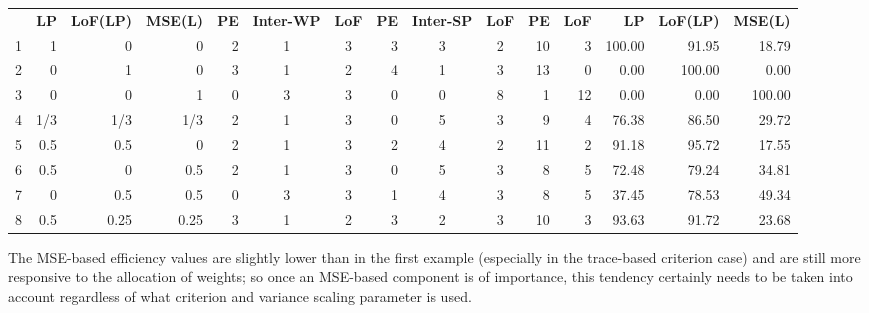 \begin{table}[h]
{\begin{tabular}{rrrrccccccrrrrr}
  & \textbf{LP} & \textbf{LoF(LP)} & \textbf{MSE(L)} & \textbf{PE} & \textbf{Inter-WP} & \textbf{LoF} & \textbf{PE} & \textbf{Inter-SP} & \textbf{LoF}& \textbf{PE}      & \textbf{LoF}      & \textbf{LP} & \textbf{LoF(LP)} & \textbf{MSE(L)} \\
1 & 1    & 0    & 0    & \multicolumn{1}{|r}{2} & 1 & 3 & \multicolumn{1}{|r}{3} & 3 & 2 & \multicolumn{1}{|r}{10} & 3  & \multicolumn{1}{|r}{100.00} & 91.95  & 18.79  \\
2 & 0    & 1    & 0    & \multicolumn{1}{|r}{3} & 1 & 2 & \multicolumn{1}{|r}{4} & 1 & 3 & \multicolumn{1}{|r}{13} & 0  & \multicolumn{1}{|r}{0.00}   & 100.00 & 0.00   \\
3 & 0    & 0    & 1    & \multicolumn{1}{|r}{0} & 3 & 3 & \multicolumn{1}{|r}{0} & 0 & 8 & \multicolumn{1}{|r}{1}  & 12 & \multicolumn{1}{|r}{0.00}   & 0.00   & 100.00 \\
4 & 1/3 & 1/3 & 1/3    & \multicolumn{1}{|r}{2} & 1 & 3 & \multicolumn{1}{|r}{0} & 5 & 3 & \multicolumn{1}{|r}{9}  & 4  & \multicolumn{1}{|r}{76.38}  & 86.50  & 29.72  \\
5 & 0.5  & 0.5  & 0    & \multicolumn{1}{|r}{2} & 1 & 3 & \multicolumn{1}{|r}{2} & 4 & 2 & \multicolumn{1}{|r}{11} & 2  & \multicolumn{1}{|r}{91.18}  & 95.72  & 17.55  \\
6 & 0.5  & 0    & 0.5  & \multicolumn{1}{|r}{2} & 1 & 3 & \multicolumn{1}{|r}{0} & 5 & 3 & \multicolumn{1}{|r}{8}  & 5  & \multicolumn{1}{|r}{72.48}  & 79.24  & 34.81  \\
7 & 0    & 0.5  & 0.5  & \multicolumn{1}{|r}{0} & 3 & 3 & \multicolumn{1}{|r}{1} & 4 & 3 & \multicolumn{1}{|r}{8}  & 5  & \multicolumn{1}{|r}{37.45}  & 78.53  & 49.34  \\
8 & 0.5  & 0.25 & 0.25 & \multicolumn{1}{|r}{3} & 1 & 2 & \multicolumn{1}{|r}{3} & 2 & 3 & \multicolumn{1}{|r}{10} & 3  & \multicolumn{1}{|r}{93.63}  & 91.72  & 23.68 
\end{tabular}
}
\end{table}    

The MSE-based efficiency values are slightly lower than in the first example (especially in the trace-based criterion case) and  are still more responsive to the allocation of weights; so once an MSE-based component is of importance, this tendency certainly needs to be taken into account regardless of what criterion and variance scaling parameter is used.
  
